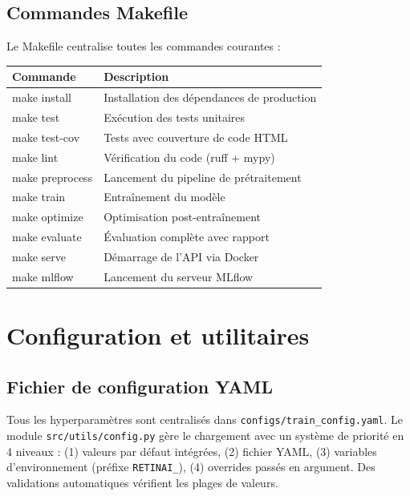 ﻿\documentclass[11pt,a4paper]{article}
\begin{document}
\subsection{Commandes Makefile}

Le Makefile centralise toutes les commandes courantes :

\begin{center}
\renewcommand{\arraystretch}{1.3}
\begin{tabularx}{\textwidth}{>{\ttfamily}lX}
\toprule
\normalfont\textbf{Commande} & \textbf{Description} \\
\midrule
make install & Installation des dépendances de production \\
make test & Exécution des tests unitaires \\
make test-cov & Tests avec couverture de code HTML \\
make lint & Vérification du code (ruff + mypy) \\
make preprocess & Lancement du pipeline de prétraitement \\
make train & Entraînement du modèle \\
make optimize & Optimisation post-entraînement \\
make evaluate & Évaluation complète avec rapport \\
make serve & Démarrage de l'API via Docker \\
make mlflow & Lancement du serveur MLflow \\
\bottomrule
\end{tabularx}
\end{center}

\section{Configuration et utilitaires}

\subsection{Fichier de configuration YAML}

Tous les hyperparamètres sont centralisés dans \texttt{configs/train\_config.yaml}. Le module \texttt{src/utils/config.py} gère le chargement avec un système de priorité en 4 niveaux : (1) valeurs par défaut intégrées, (2) fichier YAML, (3) variables d'environnement (préfixe \texttt{RETINAI\_}), (4) overrides passés en argument. Des validations automatiques vérifient les plages de valeurs.
\end{document}

